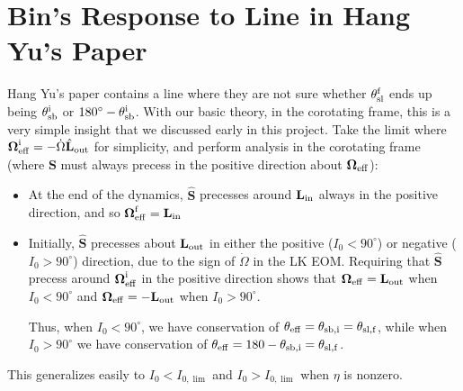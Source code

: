 \documentclass[11pt,
        usenames, %
        dvipsnames %
    ]{article}
\newcommand*{\bm}[1]{\boldsymbol{\mathbf{#1}}}
\newcommand*{\uv}[1]{\hat{\bm{#1}}}
\begin{document}
\section{Bin's Response to Line in Hang Yu's Paper}

Hang Yu's paper contains a line where they are not sure whether $\theta_{\rm
sl}^{\rm f}$ ends up being $\theta_{\rm sb}^{\rm i}$ or $180^\circ -
\theta_{\rm sb}^{\rm i}$. With our basic theory, in the corotating
frame, this is a very simple insight that we discussed early in this project.
Take the limit where $\bm{\Omega}_{\rm eff}^{\rm i} = -\dot{\Omega}\uv{L}_{\rm
out}$ for simplicity, and perform analysis in the corotating frame (where
$\bm{S}$ must always precess in the positive direction about $\bm{\Omega}_{\rm
eff}$):
\begin{itemize}
    \item At the end of the dynamics, $\uv{S}$ precesses around $\bm{L}_{\rm
        in}$ always in the positive direction, and so $\bm{\Omega}_{\rm
        eff}^{\rm f} = \bm{L}_{\rm in}$

    \item Initially, $\uv{S}$ precesses about $\bm{L}_{\rm out}$ in either the
        positive ($I_0 < 90^\circ$) or negative ($I_0 > 90^\circ$) direction,
        due to the sign of $\dot{\Omega}$ in the LK EOM\@. Requiring that
        $\uv{S}$ precess around $\bm{\Omega}_{\rm eff}^{\rm i}$ in the positive
        direction shows that $\bm{\Omega}_{\rm eff} = \bm{L}_{\rm out}$ when
        $I_0 < 90^\circ$ and $\bm{\Omega}_{\rm eff} = -\bm{L}_{\rm out}$ when
        $I_0 > 90^\circ$.

        Thus, when $I_0 < 90^\circ$, we have conservation of $\theta_{\rm eff} =
        \theta_{\rm sb, i} = \theta_{\rm sl, f}$, while when $I_0 > 90^\circ$ we
        have conservation of $\theta_{\rm eff} = 180 - \theta_{\rm sb, i} =
        \theta_{\rm sl, f}$.
\end{itemize}
This generalizes easily to $I_0 < I_{0,\lim}$ and $I_0 > I_{0, \lim}$ when
$\eta$ is nonzero.
\end{document}
